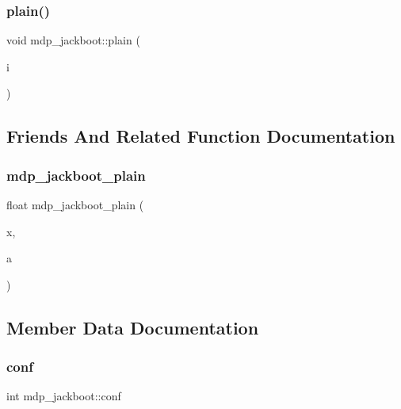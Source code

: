 \subsubsection{\texorpdfstring{plain()}{plain()}}
{\footnotesize\ttfamily void mdp\+\_\+jackboot\+::plain (\begin{DoxyParamCaption}\item[{int}]{i }\end{DoxyParamCaption})\hspace{0.3cm}{\ttfamily [inline]}}



\subsection{Friends And Related Function Documentation}
\mbox{\label{classmdp__jackboot_ad5b6e252253804e3e371008fbad7b43a}} 
\subsubsection{\texorpdfstring{mdp\+\_\+jackboot\+\_\+plain}{mdp\_jackboot\_plain}}
{\footnotesize\ttfamily float mdp\+\_\+jackboot\+\_\+plain (\begin{DoxyParamCaption}\item[{float $\ast$}]{x,  }\item[{void $\ast$}]{a }\end{DoxyParamCaption})\hspace{0.3cm}{\ttfamily [friend]}}



\subsection{Member Data Documentation}
\mbox{\label{classmdp__jackboot_ae84ce36555fb3089989232ca91d80e15}} 
\subsubsection{\texorpdfstring{conf}{conf}}
{\footnotesize\ttfamily int mdp\+\_\+jackboot\+::conf}

